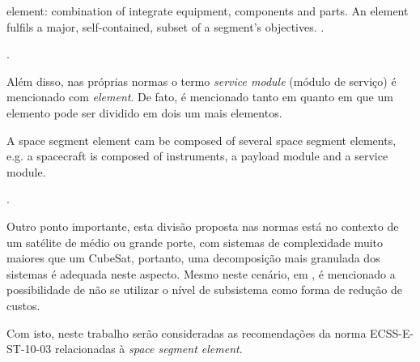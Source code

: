 \begin{citacao}
    element: combination of integrate equipment, components and parts. An element fulfils a major, self-contained, subset of a segment's objectives. \cite[p. 9]{ecss-s-st-00-01}.
\end{citacao}.

Além disso, nas próprias normas o termo \textit{service module} (módulo de serviço) é mencionado com \textit{element}. De fato, é mencionado tanto em \textcite{ecss-s-st-00-01} quanto em \textcite{ecss-e-st-10-03} que um elemento pode ser dividido em dois um mais elementos.

\begin{citacao}
    A space segment element cam be composed of several space segment elements, e.g. a spacecraft is composed of instruments, a payload module and a service module. \cite[p. 10]{ecss-s-st-00-01}
\end{citacao}.

Outro ponto importante, esta divisão proposta nas normas está no contexto de um satélite de médio ou grande porte, com sistemas de complexidade muito maiores que um CubeSat, portanto, uma decomposição mais granulada dos sistemas é adequada neste aspecto.
Mesmo neste cenário, em \textcite{ecss-e-hb-10-02}, é mencionado a possibilidade de não se utilizar o nível de subsistema como forma de redução de custos.

Com isto, neste trabalho serão consideradas as recomendações da norma ECSS-E-ST-10-03 \cite{ecss-e-st-10-03} relacionadas à \textit{space segment element}.


